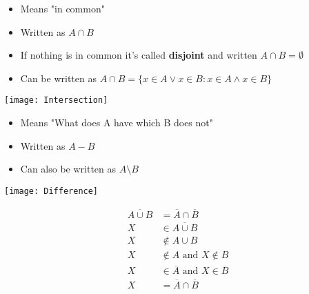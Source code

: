 \documentclass[english,10pt,a4paper]{article}
\begin{document}
\begin{theo}[Intersection] 
\begin{minipage}{0.7\linewidth}
\begin{itemize}
\item Means "in common"
\item Written as $A \cap B$ 
\item If nothing is in common it's called \textbf{disjoint} and written $A \cap B = \emptyset$
\item Can be written as $A \cap B = \{ x \in A \vee x \in B : x \in A \wedge x \in B \}$
\end{itemize}
\end{minipage}
\hspace{0.25cm}
\begin{minipage}{0.25\linewidth}
\texttt{[image: Intersection]}
\end{minipage}
\end{theo}



\begin{theo}[Difference] 
\begin{minipage}{0.7\linewidth}
\begin{itemize}
\item Means "What does A have which B does not"
\item Written as $A - B$ 
\item Can also be written as $A \setminus B $
\end{itemize}
\end{minipage}
\hspace{0.25cm}
\begin{minipage}{0.25\linewidth}
\texttt{[image: Difference]}
\end{minipage}

\end{theo}


\begin{theo} 
\begin{align*}
\overline{A \cup B} &= \overline{A} \cap \overline{B}\\
X &\in \overline{A \cup B} \\
X &\not \in A \cup B\\
X &\not \in A\text{ and }X \not \in B\\
X & \in \overline{A}\text{ and }X \in \overline{B}\\
X &=\overline{A} \cap \overline{B}
\end{align*}
\end{theo}
\end{document}
